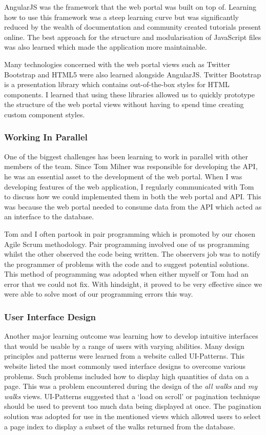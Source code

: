 \documentclass[11pt,a4paper]{report}
\begin{document}
AngularJS was the framework that the web portal was built on top of. Learning how to use this framework was a steep learning curve but was significantly reduced by the wealth of documentation and community created tutorials present online. The best approach for the structure and modularisation of JavaScript files was also learned which made the application more maintainable. 

Many technologies concerned with the web portal views such as Twitter Bootstrap and HTML5 were also learned alongside AngularJS. Twitter Bootstrap is a presentation library which contains out-of-the-box styles for HTML components. I learned that using these libraries allowed us to quickly prototype the structure of the web portal views without having to spend time creating custom component styles.

\subsubsection{Working In Parallel}
One of the biggest challenges has been learning to work in parallel with other members of the team. Since Tom Milner was responsible for developing the API, he was an essential asset to the development of the web portal. When I was developing features of the web application, I regularly communicated with Tom to discuss how we could implemented them in both the web portal and API. This was because the web portal needed to consume data from the API which acted as an interface to the database.

Tom and I often partook in pair programming which is promoted by our chosen Agile Scrum methodology. Pair programming involved one of us programming whilst the other observed the code being written. The observers job was to notify the programmer of problems with the code and to suggest potential solutions. This method of programming was adopted when either myself or Tom had an error that we could not fix. With hindsight, it proved to be very effective since we were able to solve most of our programming errors this way.

\subsubsection{User Interface Design}
Another major learning outcome was learning how to develop intuitive interfaces that would be usable by a range of users with varying abilities. Many design principles and patterns were learned from a website called UI-Patterns\cite{uipatterns}. This website listed the most commonly used interface designs to overcome various problems. Such problems included how to display high quantities of data on a page. This was a problem encountered during the design of the \emph{all walks} and \emph{my walks} views. UI-Patterns suggested that a `load on scroll' or pagination technique should be used to prevent too much data being displayed at once. The pagination solution was adopted for use in the mentioned views which allowed users to select a page index to display a subset of the walks returned from the database.
\end{document}
